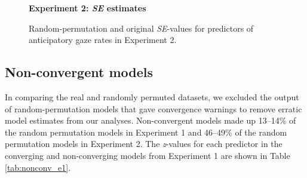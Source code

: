 \documentclass[authoryear, 12pt]{elsarticle}
\begin{document}
\begin{figure}
  \centering
  \textbf{Experiment 2: \textit{SE} estimates}\par\medskip
  \hfill
  \caption{Random-permutation and original \textit{SE}-values for predictors of anticipatory gaze rates in Experiment 2.}
\label{fig:E2-SEs}
\end{figure}

\clearpage

\subsection{Non-convergent models}
In comparing the real and randomly permuted datasets, we excluded the output of random-permutation models that gave convergence warnings to remove erratic model estimates from our analyses. Non-convergent models made up 13--14\% of the random permutation models in Experiment 1 and 46--49\% of the random permutation models in Experiment 2. The \textit{z}-values for each predictor in the converging and non-converging models from Experiment 1 are shown in Table \ref{tab:nonconv_e1}.
\end{document}
